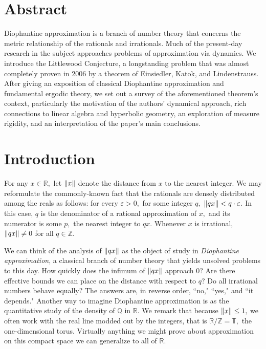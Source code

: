 \documentclass[12pt, letterpaper, oneside]{book}
\renewcommand{\ge}{\ensuremath{\varepsilon}}
\newcommand{\Q}{\mathbb{Q}}
\newcommand{\R}{\mathbb{R}}
\newcommand{\Z}{\mathbb{Z}}
\newcommand{\T}{\mathbb{T}}
\DeclarePairedDelimiter{\norm}{\lVert}{\rVert}
\theoremstyle{plain}
\theoremstyle{definition}
\theoremstyle{remark}
\begin{document}
\chapter*{Abstract}
Diophantine approximation is a branch of number theory that concerns the metric relationship of the rationals and irrationals. Much of the present-day research in the subject approaches problems of approximation via dynamics. We introduce the Littlewood Conjecture, a longstanding problem that was almost completely proven in 2006 by a theorem of Einsiedler, Katok, and Lindenstrauss. After giving an exposition of classical Diophantine approximation and fundamental ergodic theory, we set out a survey of the aforementioned theorem's context, particularly the motivation of the authors' dynamical approach, rich connections to linear algebra and hyperbolic geometry, an exploration of measure rigidity, and an interpretation of the paper's main conclusions. 


\setcounter{tocdepth}{0} %
\tableofcontents

\mainmatter
\chapter{Introduction}

For any $x \in \R,$ let $\norm{x}$ denote the distance from $x$ to the nearest integer. We may reformulate the commonly-known fact that the rationals are densely distributed among the reals as follows: for every $\ge > 0,$ for some integer $q,$ $\norm{qx} < q\cdot\ge.$ In this case, $q$ is the denominator of a rational approximation of $x,$ and its numerator is some $p,$ the nearest integer to $qx.$ Whenever $x$ is irrational, $\norm{qx} \neq 0$ for all $q \in \Z.$ 

We can think of the analysis of $\norm{qx}$ as the object of study in \textit{Diophantine approximation}, a classical branch of number theory that yields unsolved problems to this day. How quickly does the infimum of $\norm{qx}$ approach 0? Are there effective bounds we can place on the distance with respect to $q$? Do all irrational numbers behave equally? The answers are, in reverse order, ``no," ``yes," and ``it depends." Another way to imagine Diophantine approximation is as the quantitative study of the density of $\Q$ in $\R.$ We remark that because $\norm{x} \leq 1,$ we often work with the real line modded out by the integers, that is $\R/\Z = \T,$ the one-dimensional torus. Virtually anything we might prove about approximation on this compact space we can generalize to all of $\R.$ 
\end{document}
